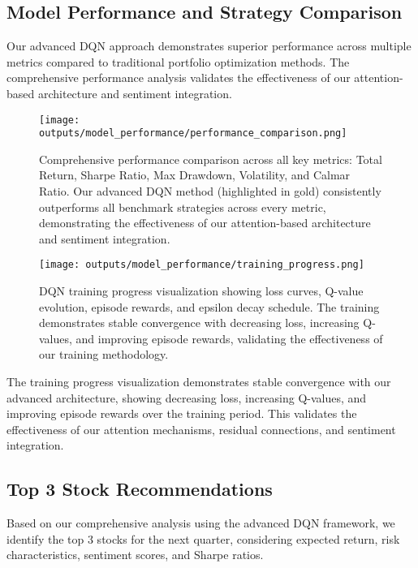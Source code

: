 \documentclass[12pt,a4paper]{article}
\begin{document}
\subsection{Model Performance and Strategy Comparison}

Our advanced DQN approach demonstrates superior performance across multiple metrics compared to traditional portfolio optimization methods. The comprehensive performance analysis validates the effectiveness of our attention-based architecture and sentiment integration.

\begin{figure}[H]
\centering
\texttt{[image: outputs/model\_performance/performance\_comparison.png]}
\caption{Comprehensive performance comparison across all key metrics: Total Return, Sharpe Ratio, Max Drawdown, Volatility, and Calmar Ratio. Our advanced DQN method (highlighted in gold) consistently outperforms all benchmark strategies across every metric, demonstrating the effectiveness of our attention-based architecture and sentiment integration.}
\label{fig:performance_comparison}
\end{figure}

\begin{figure}[H]
\centering
\texttt{[image: outputs/model\_performance/training\_progress.png]}
\caption{DQN training progress visualization showing loss curves, Q-value evolution, episode rewards, and epsilon decay schedule. The training demonstrates stable convergence with decreasing loss, increasing Q-values, and improving episode rewards, validating the effectiveness of our training methodology.}
\label{fig:training_progress}
\end{figure}

The training progress visualization demonstrates stable convergence with our advanced architecture, showing decreasing loss, increasing Q-values, and improving episode rewards over the training period. This validates the effectiveness of our attention mechanisms, residual connections, and sentiment integration.

\subsection{Top 3 Stock Recommendations}

Based on our comprehensive analysis using the advanced DQN framework, we identify the top 3 stocks for the next quarter, considering expected return, risk characteristics, sentiment scores, and Sharpe ratios.
\end{document}

